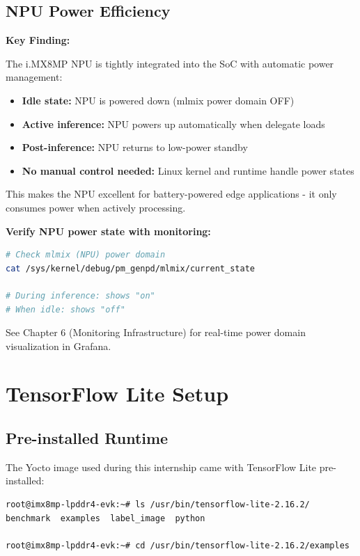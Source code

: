\documentclass[12pt,a4paper]{report}
\begin{document}
\subsection{NPU Power Efficiency}

\begin{important}
\textbf{Key Finding:}

The i.MX8MP NPU is tightly integrated into the SoC with automatic power management:
\begin{itemize}
    \item \textbf{Idle state:} NPU is powered down (mlmix power domain OFF)
    \item \textbf{Active inference:} NPU powers up automatically when delegate loads
    \item \textbf{Post-inference:} NPU returns to low-power standby
    \item \textbf{No manual control needed:} Linux kernel and runtime handle power states
\end{itemize}

This makes the NPU excellent for battery-powered edge applications - it only consumes power when actively processing.
\end{important}

\textbf{Verify NPU power state with monitoring:}
\begin{lstlisting}[language=bash]
# Check mlmix (NPU) power domain
cat /sys/kernel/debug/pm_genpd/mlmix/current_state

# During inference: shows "on"
# When idle: shows "off"
\end{lstlisting}

See Chapter 6 (Monitoring Infrastructure) for real-time power domain visualization in Grafana.

\section{TensorFlow Lite Setup}

\subsection{Pre-installed Runtime}

The Yocto image used during this internship came with TensorFlow Lite pre-installed:

\begin{lstlisting}[language=bash]
root@imx8mp-lpddr4-evk:~# ls /usr/bin/tensorflow-lite-2.16.2/
benchmark  examples  label_image  python

root@imx8mp-lpddr4-evk:~# cd /usr/bin/tensorflow-lite-2.16.2/examples
\end{lstlisting}
\end{document}
